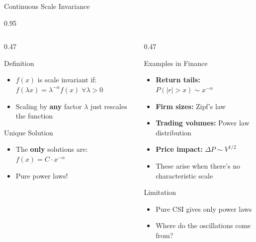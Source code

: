 \documentclass[9pt, aspectratio=169, t]{beamer}
\begin{document}
\begin{frame}{Continuous Scale Invariance}
    \begin{cminipage}{0.95\textwidth}
    {\footnotesize
    \begin{columns}[T]
        \begin{column}{0.47\textwidth}
            \begin{block}{Definition}
                \begin{itemize}\setlength{\itemsep}{0pt}
                    \item $f(x)$ is scale invariant if: $f(\lambda x) = \lambda^{-\alpha} f(x) \;\forall \lambda > 0$
                    \item Scaling by \textbf{any} factor $\lambda$ just rescales the function
                \end{itemize}
            \end{block}

            \begin{exampleblock}{Unique Solution}
                \begin{itemize}\setlength{\itemsep}{0pt}
                    \item The \textbf{only} solutions are: $f(x) = C \cdot x^{-\alpha}$
                    \item Pure power laws!
                \end{itemize}
            \end{exampleblock}
        \end{column}
        \begin{column}{0.47\textwidth}
            \begin{exampleblock}{Examples in Finance}
                \begin{itemize}\setlength{\itemsep}{0pt}
                    \item \textbf{Return tails:} $P(|r| > x) \sim x^{-\alpha}$
                    \item \textbf{Firm sizes:} Zipf's law
                    \item \textbf{Trading volumes:} Power law distribution
                    \item \textbf{Price impact:} $\Delta P \sim V^{1/2}$
                    \item These arise when there's no characteristic scale
                \end{itemize}
            \end{exampleblock}

            \begin{block}{Limitation}
                \begin{itemize}\setlength{\itemsep}{0pt}
                    \item Pure CSI gives only power laws
                    \item Where do the oscillations come from?
                \end{itemize}
            \end{block}
        \end{column}
    \end{columns}
    }
    \end{cminipage}
\end{frame}
\end{document}

